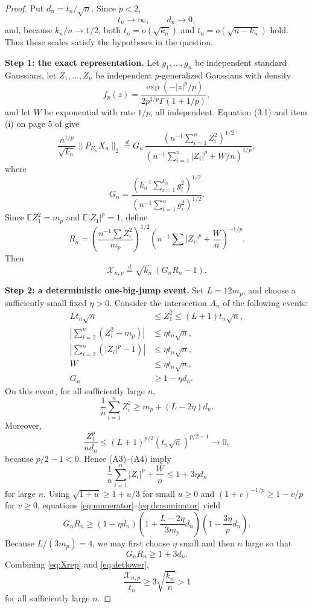 \documentclass[11pt]{article}
\newcommand{\E}{\mathbb E}
\newcommand{\Xscr}{\mathscr X}
\begin{document}
\begin{proof}
Put $d_n=t_n/\sqrt n$.  Since $p<2$,
\[
 t_n\longrightarrow\infty,\qquad
 d_n\longrightarrow0,
\]
and, because $k_n/n\to1/2$, both $t_n=o(\sqrt{k_n})$ and
$t_n=o(\sqrt{n-k_n})$ hold.  Thus these scales satisfy the hypotheses in the
question.

\medskip
\noindent\textbf{Step 1: the exact representation.}
Let $g_1,\ldots,g_n$ be independent standard Gaussians, let
$Z_1,\ldots,Z_n$ be independent $p$-generalized Gaussians with density
\[
 f_p(z)=\frac{\exp(-|z|^p/p)}{2p^{1/p}\Gamma(1+1/p)},
\]
and let $W$ be exponential with rate $1/p$, all independent.  Equation (3.1)
and item (i) on page 5 of \cite{APT2020} give
\[
 \frac{n^{1/p}}{\sqrt{k_n}}\|P_{E_n}X_n\|_2
 \stackrel d=
 G_n\,
 \frac{(n^{-1}\sum_{i=1}^n Z_i^2)^{1/2}}
 {(n^{-1}\sum_{i=1}^n |Z_i|^p+W/n)^{1/p}},
\]
where
\[
 G_n=\frac{(k_n^{-1}\sum_{i=1}^{k_n}g_i^2)^{1/2}}
 {(n^{-1}\sum_{i=1}^n g_i^2)^{1/2}}.
\]
Since $\E Z_1^2=m_p$ and $\E|Z_1|^p=1$, define
\[
 R_n=\left(\frac{n^{-1}\sum Z_i^2}{m_p}\right)^{1/2}
 \left(n^{-1}\sum |Z_i|^p+\frac Wn\right)^{-1/p}.
\]
Then
\begin{equation}\label{eq:Xrep}
 \Xscr_{n,p}\stackrel d=\sqrt{k_n}\,(G_nR_n-1).
\end{equation}

\medskip
\noindent\textbf{Step 2: a deterministic one-big-jump event.}
Set $L=12m_p$, and choose a sufficiently small fixed $\eta>0$.  Consider the
intersection $A_n$ of the following events:
\begin{align*}
 L t_n\sqrt n&\le Z_1^2\le(L+1)t_n\sqrt n,\tag{A1}\\
 \left|\sum_{i=2}^n(Z_i^2-m_p)\right|&\le\eta t_n\sqrt n,\tag{A2}\\
 \left|\sum_{i=2}^n(|Z_i|^p-1)\right|&\le\eta t_n\sqrt n,\tag{A3}\\
 W&\le\eta t_n\sqrt n,\tag{A4}\\
 G_n&\ge1-\eta d_n.\tag{A5}
\end{align*}
On this event, for all sufficiently large $n$,
\begin{equation}\label{eq:numerator}
 \frac1n\sum_{i=1}^n Z_i^2
 \ge m_p+(L-2\eta)d_n.
\end{equation}
Moreover,
\[
 \frac{Z_1^p}{n d_n}
 \le (L+1)^{p/2}(t_n\sqrt n)^{p/2-1}\longrightarrow0,
\]
because $p/2-1<0$.  Hence (A3)--(A4) imply
\begin{equation}\label{eq:denominator}
 \frac1n\sum_{i=1}^n|Z_i|^p+\frac Wn\le1+3\eta d_n
\end{equation}
for large $n$.  Using
$\sqrt{1+u}\ge1+u/3$ for small $u\ge0$ and
$(1+v)^{-1/p}\ge1-v/p$ for $v\ge0$, equations
\eqref{eq:numerator}--\eqref{eq:denominator} yield
\[
 G_nR_n\ge
 (1-\eta d_n)
 \left(1+\frac{L-2\eta}{3m_p}d_n\right)
 \left(1-\frac{3\eta}{p}d_n\right).
\]
Because $L/(3m_p)=4$, we may first choose $\eta$ small and then $n$ large so
that
\begin{equation}\label{eq:detlower}
 G_nR_n\ge1+3d_n.
\end{equation}
Combining \eqref{eq:Xrep} and \eqref{eq:detlower},
\[
 \frac{\Xscr_{n,p}}{t_n}
 \ge 3\sqrt{\frac{k_n}{n}}>1
\]
for all sufficiently large $n$.


\end{proof}
\end{document}
